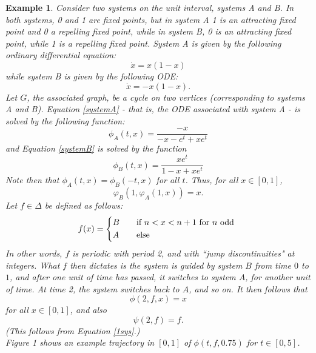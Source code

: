 \documentclass[11pt]{article}
\newtheorem{ex}[thm]{Example}
\begin{document}
\begin{ex}
Consider two systems on the unit interval, systems A and B.  In both systems, 0 and 1 are fixed points, but in system A 1 is an attracting fixed point and 0 a repelling fixed point, while in system B, 0 is an attracting fixed point, while 1 is a repelling fixed point.  System A is given by the following ordinary differential equation:
\begin{equation}\label{systemA}\dot{x}=x(1-x)\end{equation}
while system B is given by the following ODE:
\begin{equation}\label{systemB}\dot{x}=-x(1-x).\end{equation}
Let $G$, the associated graph, be a cycle on two vertices (corresponding to systems A and B).  Equation \ref{systemA} - that is, the ODE associated with system A - is solved by the following function:
$$\phi_A(t,x)=\frac{-x}{-x-e^t+xe^t}$$
and Equation \ref{systemB} is solved by the function
$$\phi_B(t,x)=\frac{xe^t}{1-x+xe^t}$$
Note then that $\phi_A(t,x)=\phi_B(-t,x)$ for all $t$.  Thus, for all $x\in[0,1]$, 
\begin{equation}\label{1sys}\varphi_B(1,\varphi_A(1,x))=x.\end{equation}
Let $f\in\Delta$ be defined as follows:
\[ f(x) =
  \begin{cases*}
    B \quad& if $ n<x<n+1$ for $n$ odd \\
    A & else \\
  \end{cases*}\]
In other words, $f$ is periodic with period 2, and with ``jump discontinuities" at integers.   What $f$ then dictates is the system is guided by system $B$ from time $0$ to $1$, and after one unit of time has passed, it switches to system $A$, for another unit of time.  At time 2, the system switches back to $A$, and so on.  It then follows that
$$\phi(2,f,x)=x$$
for all $x\in[0,1]$, and also
$$\psi(2,f)=f.$$
(This follows from Equation \ref{1sys}.)   \\

\noindent Figure 1 shows an example trajectory in $[0,1]$ of $\phi(t,f,0.75)$ for $t\in[0,5]$.
\vspace{5mm}


\end{ex}
\end{document}
